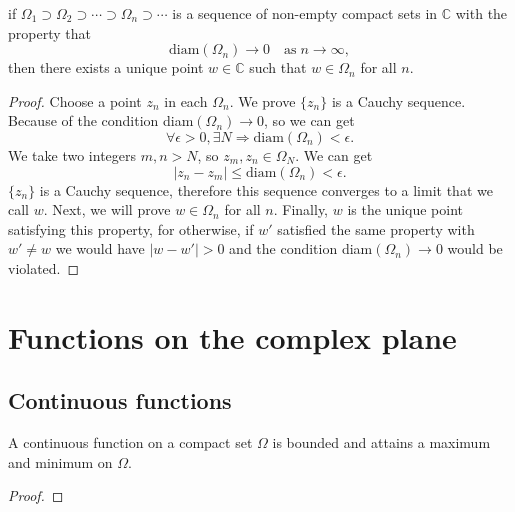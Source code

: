 \begin{proposition}
    if $\Omega_1\supset\Omega_2\supset\cdots\supset\Omega_n\supset\cdots$ is a sequence
    of non-empty compact sets in $\mathbb{C}$ with the property that
    \[
        \text{diam}(\Omega_n)\to 0\quad\text{as}\; n\to\infty,
    \]
    then there exists a unique point $w\in\mathbb{C}$ such
    that $w\in\Omega_n$ for all $n$.
\end{proposition}
\begin{proof}
    Choose a point $z_n$ in each $\Omega_n$. We prove $\{z_n\}$ is a Cauchy sequence.
    Because of the condition diam$(\Omega_n)\to 0$, so we can get
    \[
        \forall \epsilon>0, \exists N\Rightarrow \text{diam}(\Omega_n)<\epsilon.
    \]
    We take two integers $m,n>N$, so $z_m,z_n\in\Omega_N$. We can get
    \[
        |z_n-z_m|\le \text{diam}(\Omega_n)<\epsilon.
    \]
    $\{z_n\}$ is a Cauchy sequence, therefore this sequence converges to a limit that
    we call $w$. Next, we will prove $w\in \Omega_n$ for all $n$. Finally, $w$ is the
    unique point satisfying this property, for otherwise, if $w'$ satisfied the same
    property with $w'\ne w$ we would have $|w-w'|>0$ and the
    condition diam$(\Omega_n)\to 0$ would be violated.
\end{proof}





\section{Functions on the complex plane}

\subsection{Continuous functions}

\begin{theorem}
    A continuous function on a compact set $\Omega$ is bounded and attains
    a maximum and minimum on $\Omega$.
\end{theorem}
\begin{proof}
    
\end{proof}

